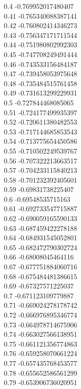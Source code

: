 {0.4	-0.769952017480407\\
0.41	-0.765340088387141\\
0.42	-0.760802414346273\\
0.43	-0.756347171711544\\
0.44	-0.751980802992303\\
0.45	-0.747708249491444\\
0.46	-0.743533156484187\\
0.47	-0.739458053975648\\
0.48	-0.735484515761458\\
0.49	-0.731613299229931\\
0.5	-0.727844468085065\\
0.51	-0.724177499935397\\
0.52	-0.720611380482553\\
0.53	-0.717144685853543\\
0.54	-0.713775654450586\\
0.55	-0.710502249539767\\
0.56	-0.707322213663517\\
0.57	-0.704233115840213\\
0.58	-0.701232392405601\\
0.59	-0.69831738225407\\
0.6	-0.69548535715163\\
0.61	-0.692733547715887\\
0.62	-0.690059165590133\\
0.63	-0.687459422278188\\
0.64	-0.684931545052801\\
0.65	-0.682472790302724\\
0.66	-0.68008045464116\\
0.67	-0.677751884060716\\
0.68	-0.675484481386615\\
0.69	-0.67327571225037\\
0.7	-0.671123109779887\\
0.71	-0.669024278178742\\
0.72	-0.666976895346774\\
0.73	-0.664978714675906\\
0.74	-0.663027566138951\\
0.75	-0.661121356774863\\
0.76	-0.659258070661224\\
0.77	-0.657435768453577\\
0.78	-0.655652586561299\\
0.79	-0.653906736020951\\
}
